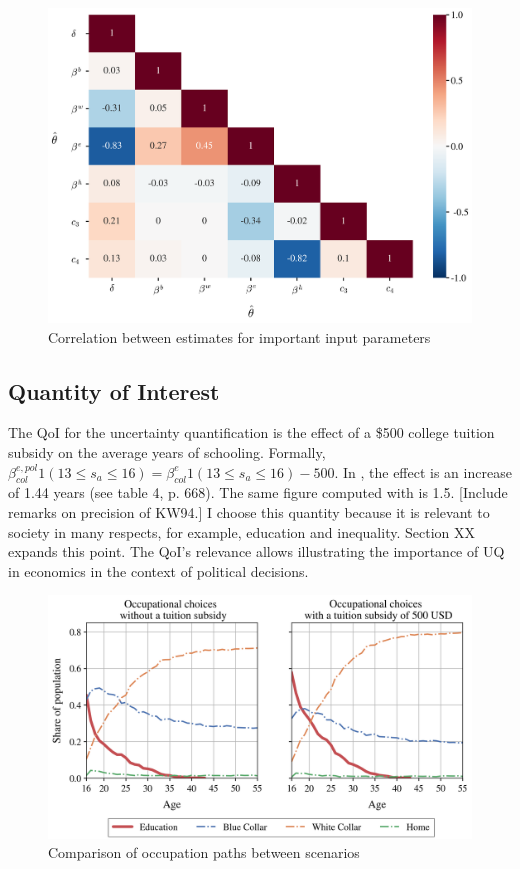 \begin{figure}[H] \label{fig:corr}
	\caption{Correlation between estimates for important input parameters}
	\centering
	\includegraphics[scale=0.45]{../figures/heatmap_corr_chol}
\end{figure}

\subsection{Quantity of Interest}

The QoI for the uncertainty quantification is the effect of a \$500 college tuition subsidy on the average years of schooling. Formally, $\beta_{col}^{e,pol} 1(13 \leq s_a \leq 16) = \beta_{col}^e 1(13 \leq s_a \leq 16) - 500$. In \cite{Keane.1994}, the effect is an increase of 1.44 years (see table 4, p. 668). The same figure computed with  is 1.5. [Include remarks on precision of KW94.] I choose this quantity because it is relevant to society in many respects, for example, education and inequality. Section XX expands this point. The QoI's relevance allows illustrating the importance of UQ in economics in the context of political decisions.

\begin{figure}[H]
	\caption{Comparison of occupation paths between scenarios}
	\centering
	\includegraphics[scale=0.75]{../figures/occ_paths}
\end{figure}

